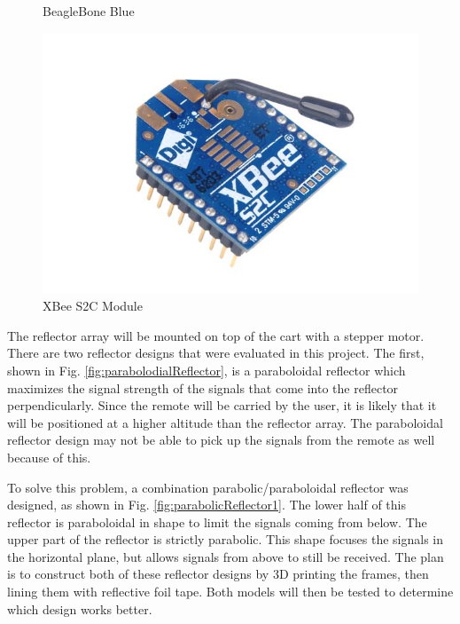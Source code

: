 \begin{figure}
\begin{minipage}[t]{0.32\textwidth}
    \captionsetup{width=\textwidth}
    \caption{BeagleBone Blue}
    \label{fig:beagleboneBlue}
  \end{minipage}
  \begin{minipage}[t]{0.32\textwidth}
    \includegraphics[width=1\textwidth]{figs/img/Xbee-S2C-Module}
    \captionsetup{width=\textwidth}
    \caption{XBee S2C Module}
    \label{fig:XBeeModule}
  \end{minipage}
\end{figure}

\vspace*{12pt}
\noindent
The reflector array will be mounted on top of the cart with a stepper motor. There are two reflector designs that were evaluated in this project. The first, shown in Fig. \ref{fig:parabolodialReflector}, is a paraboloidal reflector which maximizes the signal strength of the signals that come into the reflector perpendicularly. Since the remote will be carried by the user, it is likely that it will be positioned at a higher altitude than the reflector array. The paraboloidal reflector design may not be able to pick up the signals from the remote as well because of this.

\vspace*{12pt}
\noindent
To solve this problem, a combination parabolic/paraboloidal reflector was designed, as shown in Fig. \ref{fig:parabolicReflector1}. The lower half of this reflector is paraboloidal in shape to limit the signals coming from below. The upper part of the reflector is strictly parabolic. This shape focuses the signals in the horizontal plane, but allows signals from above to still be received. The plan is to construct both of these reflector designs by 3D printing the frames, then lining them with reflective foil tape. Both models will then be tested to determine which design works better.

